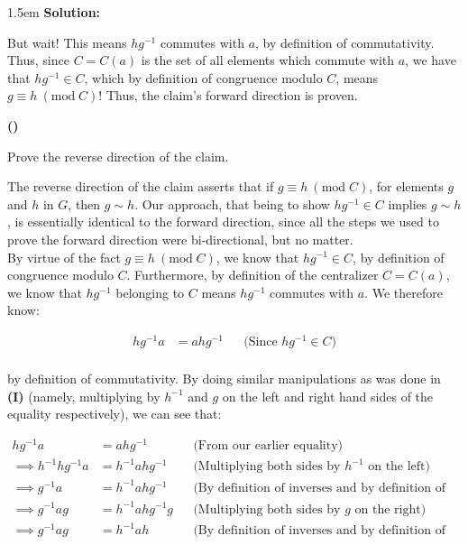 \documentclass{article}
\newenvironment{solution}{
	\vspace{.5em}
	\par
	\begin{adjustwidth}{1.5em}{}
	\textbf{{Solution:}}
	\par
	\vspace{.5em}
}{
	\vspace{1em}
	\end{adjustwidth}
	\setcounter{step}{0}
	\newpage
}
\newcounter{step}
\renewcommand{\thestep}{\Roman{step}}
\newenvironment{step}{
	\refstepcounter{step}
	\vspace{1em}\par\noindent
	\ignorespaces\noindent\textbf{(\thestep)}
	\ignorespaces
}{
	\par
	\vspace{1.5em}
}
\renewcommand{\mod}[1]{\ (\text{mod} \; {#1})}
\begin{document}
\begin{solution}
	But wait! This means $hg^{-1}$ commutes with $a$, by definition of commutativity. Thus, since $C = C(a)$ is the set of all elements which commute with $a$, we have that $hg^{-1} \in C$, which by definition of congruence modulo $C$, means $g \equiv h \mod{C}$! Thus, the claim's forward direction is proven.

	\begin{step}
		Prove the reverse direction of the claim.
	\end{step}

	The reverse direction of the claim asserts that if $g \equiv h \mod{C}$, for elements $g$ and $h$ in $G$, then $g \sim h$. Our approach, that being to show $hg^{-1} \in C$ implies $g \sim h$, is essentially identical to the forward direction, since all the steps we used to prove the forward direction were bi-directional, but no matter. \\

	By virtue of the fact $g \equiv h \mod{C}$, we know that $hg^{-1} \in C$, by definition of congruence modulo $C$. Furthermore, by definition of the centralizer $C = C(a)$, we know that $hg^{-1}$ belonging to $C$ means $hg^{-1}$ commutes with $a$. We therefore know:

	\begin{align*}
		hg^{-1}a &= ahg^{-1} &&\text{(Since $hg^{-1} \in C$)} \\
	\end{align*}

	by definition of commutativity. By doing similar manipulations as was done in \textbf{(I)} (namely, multiplying by $h^{-1}$ and $g$ on the left and right hand sides of the equality respectively), we can see that:

	\begin{align*}
		hg^{-1}a &= ahg^{-1} &&\text{(From our earlier equality)} \\
		\implies h^{-1}hg^{-1}a &= h^{-1}ahg^{-1} &&\text{(Multiplying both sides by $h^{-1}$ on the left)} \\
		\implies g^{-1}a &= h^{-1}ahg^{-1} &&\text{(By definition of inverses and by definition of the identity)} \\
		\implies g^{-1}ag &= h^{-1}ahg^{-1}g &&\text{(Multiplying both sides by $g$ on the right)} \\
		\implies g^{-1}ag &= h^{-1}ah &&\text{(By definition of inverses and by definition of the identity)} \\
	\end{align*}


\end{solution}
\end{document}
